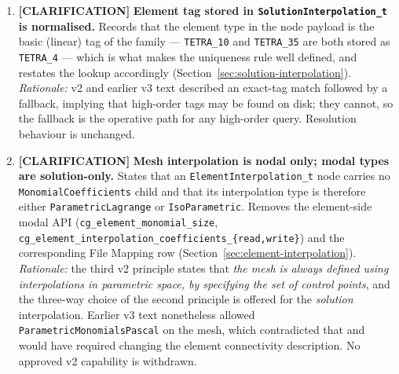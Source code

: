 \documentclass[11pt,letterpaper]{article}
\newcommand{\CLARIFY}{\textcolor{clarifybrown}{\textbf{[CLARIFICATION]}}}
\begin{document}
{\begin{enumerate}[nosep,leftmargin=1.5em]
  \item \CLARIFY{} \textbf{Element tag stored in
    \texttt{SolutionInterpolation\_t} is normalised.}  Records that the element type in
    the node payload is the basic (linear) tag of the family --- \texttt{TETRA\_10} and
    \texttt{TETRA\_35} are both stored as \texttt{TETRA\_4} --- which is what makes the
    uniqueness rule well defined, and restates the lookup accordingly
    (Section~\ref{sec:solution-interpolation}).  \textit{Rationale:} v2 and earlier v3
    text described an exact-tag match followed by a fallback, implying that high-order
    tags may be found on disk; they cannot, so the fallback is the operative path for
    any high-order query.  Resolution behaviour is unchanged.

  \item \CLARIFY{} \textbf{Mesh interpolation is nodal only; modal types are
    solution-only.}  States that an \texttt{ElementInterpolation\_t} node carries no
    \texttt{MonomialCoefficients} child and that its interpolation type is therefore
    either \texttt{ParametricLagrange} or \texttt{IsoParametric}.  Removes the
    element-side modal API (\texttt{cg\_element\_monomial\_size},
    \texttt{cg\_element\_interpolation\_coefficients\_\{read,write\}}) and the
    corresponding File Mapping row (Section~\ref{sec:element-interpolation}).
    \textit{Rationale:} the third v2 principle states that \emph{the mesh is always
    defined using interpolations in parametric space, by specifying the set of control
    points}, and the three-way choice of the second principle is offered for the
    \emph{solution} interpolation.  Earlier v3 text nonetheless allowed
    \texttt{ParametricMonomialsPascal} on the mesh, which contradicted that and would
    have required changing the element connectivity description.  No approved v2
    capability is withdrawn.
\end{enumerate}

}
\end{document}
